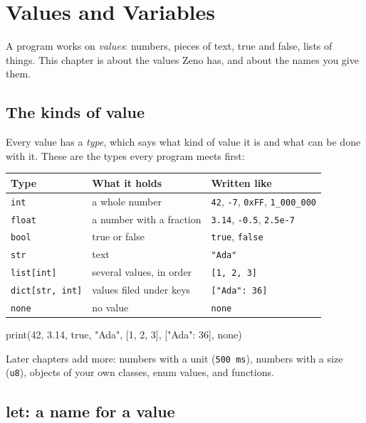 \chapter{Values and Variables}\label{ch-values}

A program works on \emph{values}: numbers, pieces of text, true and
false, lists of things. This chapter is about the values Zeno has, and
about the names you give them.

\section{The kinds of value}

Every value has a \emph{type}, which says what kind of value it is and
what can be done with it. These are the types every program meets
first:

\begin{center}
\begin{tabular}{lll}
\toprule
Type & What it holds & Written like \\
\midrule
\verb|int| & a whole number & \verb|42|, \verb|-7|, \verb|0xFF|, \verb|1_000_000| \\
\verb|float| & a number with a fraction & \verb|3.14|, \verb|-0.5|, \verb|2.5e-7| \\
\verb|bool| & true or false & \verb|true|, \verb|false| \\
\verb|str| & text & \verb|"Ada"| \\
\verb|list[int]| & several values, in order & \verb|[1, 2, 3]| \\
\verb|dict[str, int]| & values filed under keys & \verb|["Ada": 36]| \\
\verb|none| & no value & \verb|none| \\
\bottomrule
\end{tabular}
\end{center}

\begin{zeno}
print(42, 3.14, true, "Ada", [1, 2, 3], ["Ada": 36], none)
\end{zeno}

Later chapters add more: numbers with a unit (\verb|500 ms|), numbers
with a size (\verb|u8|), objects of your own classes, enum values, and
functions.

\section{let: a name for a value}

